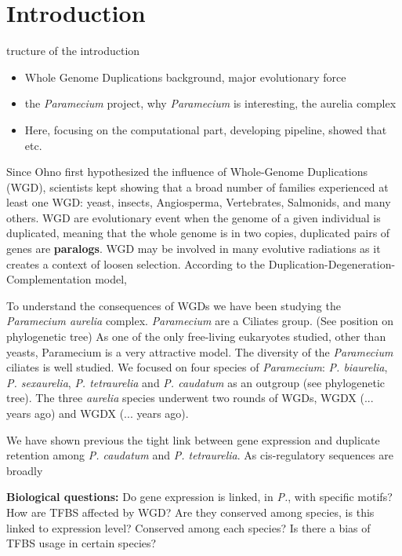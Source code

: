 \section{Introduction}

tructure of the introduction
\newline
\begin{itemize}
\item Whole Genome Duplications background, major evolutionary force
\item the \textit{Paramecium} project, why \textit{Paramecium} is interesting, the aurelia complex
\item Here, focusing on the computational part, developing pipeline, showed that etc.
\end{itemize}

Since Ohno first hypothesized the influence of Whole-Genome Duplications (WGD), scientists kept showing that a broad number of families experienced at least one WGD: yeast, insects, Angiosperma, Vertebrates, Salmonids, and many others. WGD are evolutionary event when the genome of a given individual is duplicated, meaning that the whole genome is in two copies, duplicated pairs of genes are \textbf{paralogs}. WGD may be involved in many evolutive radiations as it creates a context of loosen selection. According to the Duplication-Degeneration-Complementation model,

To understand the consequences of WGDs we have been studying the \textit{Paramecium aurelia} complex. \textit{Paramecium} are a Ciliates group. (See position on phylogenetic tree) As one of the only free-living eukaryotes studied, other than yeasts, Paramecium is a very attractive model. The diversity of the \textit{Paramecium} ciliates is well studied. We focused on four species of \textit{Paramecium}: \textit{P. biaurelia}, \textit{P. sexaurelia}, \textit{P. tetraurelia} and \textit{P. caudatum} as an outgroup (see phylogenetic tree). The three \textit{aurelia} species underwent two rounds of WGDs, WGDX (... years ago) and WGDX (... years ago).

We have shown previous the tight link between gene expression and duplicate retention among \textit{P. caudatum} and \textit{P. tetraurelia}. As cis-regulatory sequences are broadly 

\textbf{Biological questions:} Do gene expression is linked, in \textit{P.}, with specific motifs? How are TFBS affected by WGD? Are they conserved among species, is this linked to expression level? Conserved among each species? Is there a bias of TFBS usage in certain species?